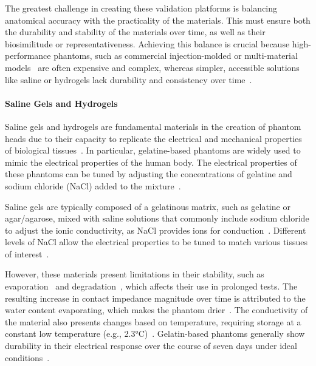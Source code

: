 The greatest challenge in creating these validation platforms is balancing anatomical accuracy with the practicality of the materials. This must ensure both the durability and stability of the materials over time, as well as their biosimilitude or representativeness. Achieving this balance is crucial because high-performance phantoms, such as commercial injection-molded or multi-material models~\cite{akor-2025} are often expensive and complex, whereas simpler, accessible solutions like saline or hydrogels lack durability and consistency over time~\cite{9475461}.

\paragraph*{Saline Gels and Hydrogels}

Saline gels and hydrogels are fundamental materials in the creation of phantom heads due to their capacity to replicate the electrical and mechanical properties of biological tissues~\cite{Owda2020}. In particular, gelatine-based phantoms are widely used to mimic the electrical properties of the human body. The electrical properties of these phantoms can be tuned by adjusting the concentrations of gelatine and sodium chloride (NaCl) added to the mixture~\cite{9475461}.

Saline gels are typically composed of a gelatinous matrix, such as gelatine or agar/agarose, mixed with saline solutions that commonly include sodium chloride to adjust the ionic conductivity, as NaCl provides ions for conduction~\cite{9475461}. Different levels of NaCl allow the electrical properties to be tuned to match various tissues of interest~\cite{Marchal01011989}.

However, these materials present limitations in their stability, such as evaporation~\cite{Owda2020} and degradation~\cite{Tseghai2021ALT}, which affects their use in prolonged tests. The resulting increase in contact impedance magnitude over time is attributed to the water content evaporating, which makes the phantom drier~\cite{C5TC01888A}. The conductivity of the material also presents changes based on temperature, requiring storage at a constant low temperature (e.g., 2.3°C)~\cite{9475461}. Gelatin-based phantoms generally show durability in their electrical response over the course of seven days under ideal conditions~\cite{9475461}.

